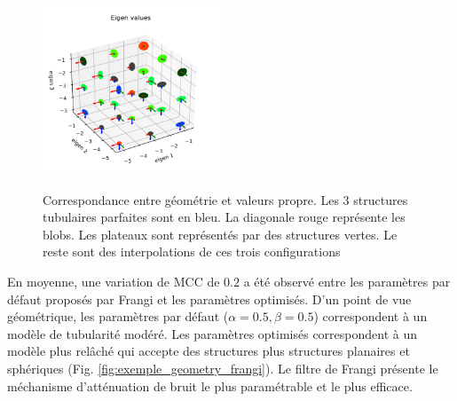 \begin{figure}[H]
  \centering
  \includegraphics[height=5cm]{Images/eigen_meaning.png}
  \label{fig:exemple_geometry}
  \caption{Correspondance entre géométrie et valeurs propre. Les 3 structures tubulaires parfaites sont en bleu. La diagonale rouge représente les blobs. Les plateaux sont représentés par des structures vertes. Le reste sont des interpolations de ces trois configurations}
\end{figure}


En moyenne, une variation de MCC de $0.2$ a été observé entre les paramètres par défaut proposés par Frangi et les paramètres optimisés. D'un point de vue géométrique, les paramètres par défaut ($\alpha=0.5,\beta=0.5$) correspondent à un modèle de tubularité modéré. Les paramètres optimisés correspondent à un modèle plus relâché qui accepte des structures plus structures planaires et sphériques (Fig. \ref{fig:exemple_geometry_frangi}). Le filtre de Frangi présente le méchanisme d'atténuation de bruit le plus paramétrable et le plus efficace.


